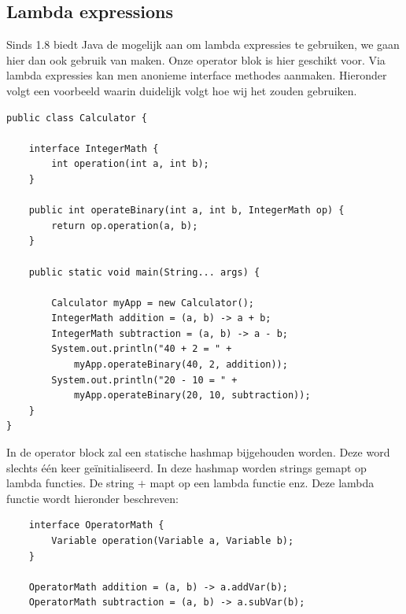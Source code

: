 \documentclass[]{article}
\begin{document}
\subsection{Lambda expressions}
\label{lambda}
Sinds 1.8 biedt Java de mogelijk aan om lambda expressies \cite{lambda} te gebruiken, we gaan hier dan ook gebruik van maken. Onze operator blok is hier geschikt voor. Via lambda expressies kan men anonieme interface methodes aanmaken. Hieronder volgt een voorbeeld waarin duidelijk volgt hoe wij het zouden gebruiken. 
\lstset{language=Java}
\begin{lstlisting}
public class Calculator {
  
    interface IntegerMath {
        int operation(int a, int b);   
    }
  
    public int operateBinary(int a, int b, IntegerMath op) {
        return op.operation(a, b);
    }
 
    public static void main(String... args) {
    
        Calculator myApp = new Calculator();
        IntegerMath addition = (a, b) -> a + b;
        IntegerMath subtraction = (a, b) -> a - b;
        System.out.println("40 + 2 = " +
            myApp.operateBinary(40, 2, addition));
        System.out.println("20 - 10 = " +
            myApp.operateBinary(20, 10, subtraction));    
    }
}
\end{lstlisting}
In de operator block zal een statische hashmap bijgehouden worden. Deze word slechts \'{e}\'{e}n keer ge\"{i}nitialiseerd. In deze hashmap worden strings gemapt op lambda functies. De string $+$ mapt op een lambda functie enz. Deze lambda functie wordt hieronder beschreven:
\begin{lstlisting}
    interface OperatorMath {
        Variable operation(Variable a, Variable b);   
    }
  
    OperatorMath addition = (a, b) -> a.addVar(b);
    OperatorMath subtraction = (a, b) -> a.subVar(b);
\end{lstlisting}
\end{document}
